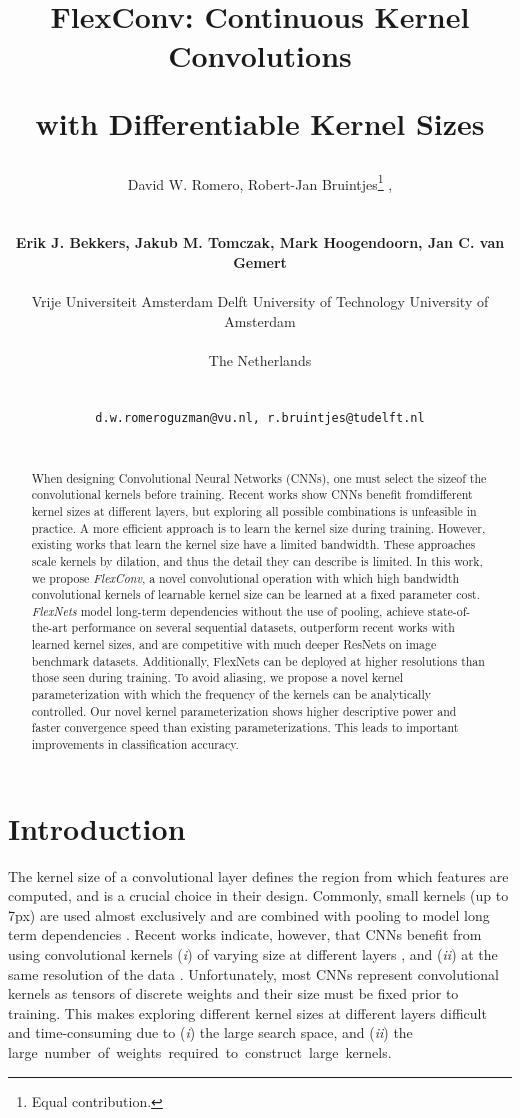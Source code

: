 \documentclass{article} \usepackage{iclr2022_conference,times}
\title{\centerline{FlexConv: Continuous Kernel Convolutions} \centerline{with Differentiable Kernel Sizes}}
\author{\centerline{David W. Romero, Robert-Jan Bruintjes\thanks{Equal contribution.} ,} \\ \centerline{\textbf{Erik J. Bekkers, Jakub M. Tomczak, Mark Hoogendoorn, Jan C. van Gemert}}\\
  \hspace{0.5mm}Vrije Universiteit Amsterdam \quad \hspace{0.5mm}Delft University of Technology \quad \hspace{0.5mm}University of Amsterdam\\
  \centerline{The Netherlands}\\
  \centerline{\texttt{d.w.romeroguzman@vu.nl, r.bruintjes@tudelft.nl}}\\
}
\begin{document}
\maketitle

\vspace{-2mm}
\begin{abstract}
   When designing Convolutional Neural Networks (CNNs), one must select the size\break of the convolutional kernels before training.
   Recent works show CNNs benefit from\break different kernel sizes at different layers, but exploring all possible combinations is unfeasible in practice. A more efficient approach is to learn the kernel size during training.
   However, existing works that learn the kernel size have a limited bandwidth.
   These approaches scale kernels by dilation, and thus the detail they can describe is limited.
   In this work, we propose \textit{FlexConv}, a novel convolutional operation with which high bandwidth convolutional kernels of learnable kernel size can be learned at a fixed parameter cost. \textit{FlexNets} model long-term dependencies without the use of pooling, achieve state-of-the-art performance on several sequential datasets, outperform recent works with learned kernel sizes, and are competitive with much deeper ResNets on image benchmark datasets. Additionally, FlexNets can be deployed at higher resolutions than those seen during training. To avoid aliasing, we propose a novel kernel parameterization with which the frequency of the kernels can be analytically controlled.
   Our novel kernel parameterization shows higher descriptive power and faster convergence speed than existing parameterizations. This leads to important improvements in classification accuracy.
\end{abstract}
\vspace{-3mm}
\section{Introduction}
\vspace{-1mm}
The kernel size of a convolutional layer defines the region from which features are computed, and is a crucial choice in their design. Commonly, small kernels (up to 7px) are used almost exclusively and are combined with pooling to model long term dependencies \citep{simonyan2014very, szegedy2015going, he2016deep,  tan2019efficientnet}. Recent works indicate, however, that CNNs benefit from using convolutional kernels (\emph{i}) of varying size at different layers \citep{pintea2021resolution, tomen2021deep}, and (\emph{ii}) at the same resolution of the data \citep{peng2017large,cordonnier2019relationship, romero2021ckconv}. Unfortunately, most CNNs represent convolutional kernels as tensors of discrete weights and their size must be fixed prior to training. This makes exploring different kernel sizes at different layers difficult and time-consuming due to (\textit{i}) the large search space, and (\textit{ii}) the large~number~of~weights~required~to~construct~large~kernels.
\end{document}
